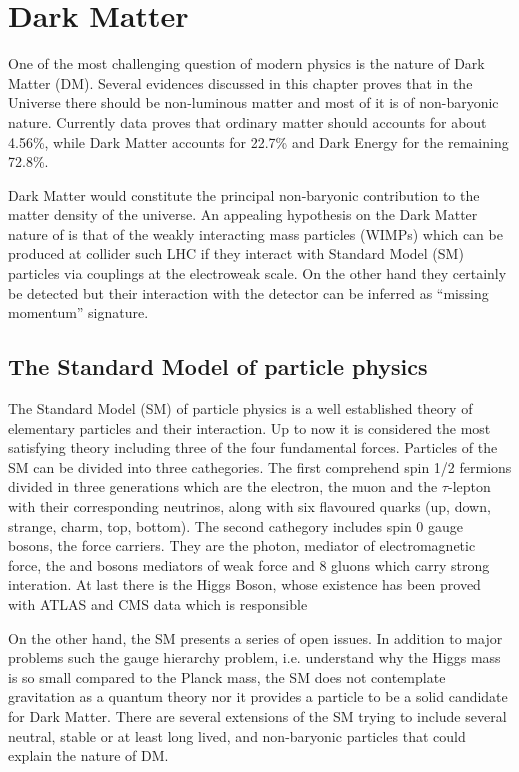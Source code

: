 \chapter{Dark Matter}
\lettrine{O}{}ne of the most challenging question of modern physics is the nature of Dark Matter (DM). Several evidences discussed in this chapter proves that in the Universe there should be non-luminous matter and most of it is of non-baryonic nature. Currently data proves that ordinary matter should accounts for about \num{4.56}\%, while Dark Matter accounts for \num{22.7}\% and Dark Energy for the remaining \num{72.8}\%.

Dark Matter would constitute the principal non-baryonic contribution to the matter density of the universe. An appealing hypothesis on the Dark Matter nature of is that of the weakly interacting mass particles (WIMPs) which can be produced at collider such LHC if they interact with Standard Model (SM) particles via couplings at the electroweak scale. On the other hand they certainly be detected but their interaction with the detector can be inferred as ``missing momentum'' signature. 

\section{The Standard Model of particle physics}
The Standard Model (SM) of particle physics is a well established theory of elementary particles and their interaction. Up to now it is considered the most satisfying theory including three of the four fundamental forces.
Particles of the SM can be divided into three cathegories. The first comprehend spin \num{1/2} fermions divided in three generations which are the electron, the muon and the $\tau$-lepton with their corresponding neutrinos, along with six flavoured quarks (up, down, strange, charm, top, bottom). The second cathegory includes spin 0 gauge bosons, the force carriers. They are the photon, mediator of electromagnetic force, the \Zboson and \Wboson bosons mediators of weak force and 8 gluons which carry strong interation. At last there is the Higgs Boson, whose existence has been proved with \RunOne ATLAS and CMS data which is responsible 

On the other hand, the SM presents a series of open issues. In addition to major problems such the gauge hierarchy problem, i.e. understand why the Higgs mass is so small compared to the Planck mass, the SM does not contemplate gravitation as a quantum theory nor it provides a particle to be a solid candidate for Dark Matter. There are several extensions of the SM trying to include several neutral, stable or at least long lived, and non-baryonic particles that could explain the nature of DM.

